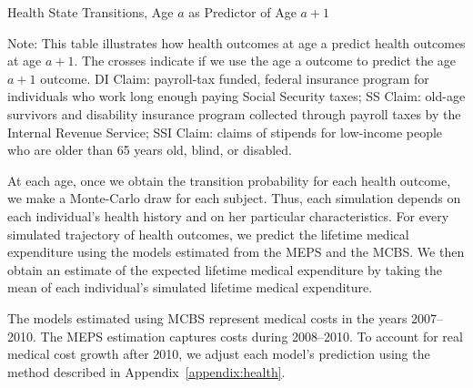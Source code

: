 \begin{table}
\begin{threeparttable}
\caption{Health State Transitions, Age $a$ as Predictor of Age $a+1$}\label{table:transition}
\tiny

\begin{tablenotes}
\footnotesize
\item Note: This table illustrates how health outcomes at age a predict health outcomes at age $a + 1$. The crosses indicate if we use the age a outcome to predict the age $a + 1$ outcome. DI Claim: payroll-tax funded, federal insurance program for individuals who work long enough paying Social Security taxes; SS Claim: old-age survivors and disability insurance program collected through payroll taxes by the Internal Revenue Service; SSI Claim: claims of stipends for low-income people who are older than 65 years old, blind, or disabled.
\end{tablenotes}
\end{threeparttable}
\end{table}

At each age, once we obtain the transition probability for each health outcome, we make a Monte-Carlo draw for each subject. Thus, each simulation depends on each individual's health history and on her particular characteristics. For every simulated trajectory of health outcomes, we predict the lifetime medical expenditure using the models estimated from the MEPS and the MCBS. We then obtain an estimate of the expected lifetime medical expenditure by taking the mean of each individual's simulated lifetime medical expenditure.

The models estimated using MCBS represent medical costs in the years 2007--2010. The MEPS estimation captures costs during 2008--2010. To account for real medical cost growth after 2010, we adjust each model's prediction using the method described in  Appendix~\ref{appendix:health}.

